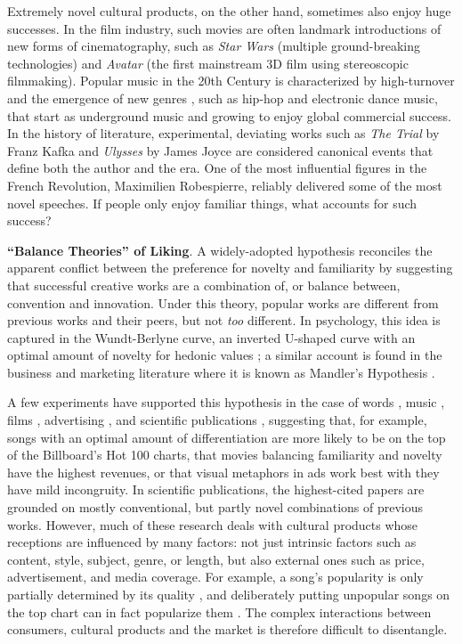\documentclass[letterpaper]{article} %
\begin{document}
Extremely novel cultural products, on the other hand, sometimes also enjoy huge successes. In the film industry, such movies are often landmark introductions of new forms of cinematography, such as \emph{Star Wars} (multiple ground-breaking technologies) and \emph{Avatar} (the first mainstream 3D film using stereoscopic filmmaking). Popular music in the 20th Century is characterized by high-turnover and the emergence of new genres \cite{mauch2015evolution}, such as hip-hop and electronic dance music, that start as underground music and growing to enjoy global commercial success. In the history of literature, experimental, deviating works such as \emph{The Trial} by Franz Kafka and \emph{Ulysses} by James Joyce are considered canonical events that define both the author and the era. One of the most influential figures in the French Revolution, Maximilien Robespierre, reliably delivered some of the most novel speeches. If people only enjoy familiar things, what accounts for such success?

\textbf{``Balance Theories'' of Liking}. A widely-adopted hypothesis reconciles the apparent conflict between the preference for novelty and familiarity by suggesting that successful creative works are a combination of, or balance between, convention and innovation. Under this theory, popular works are different from previous works and their peers, but not \emph{too} different. In psychology, this idea is captured in the Wundt-Berlyne curve, an inverted U-shaped curve with an optimal amount of novelty for hedonic values \cite{berlyne1970novelty}; a similar account is found in the business and marketing literature where it is known as Mandler's Hypothesis \cite{meyers1989schema}. 

A few experiments have supported this hypothesis in the case of words \cite{sluckin1980liking}, music \cite{hargreaves1984effects,askin2017makes},  films \cite{sreenivasan2013quantitative}, advertising \cite{mohanty2016visual}, and scientific publications \cite{uzzi2013atypical}, suggesting that, for example, songs with an optimal amount of differentiation are more likely to be on the top of the Billboard's Hot 100 charts, that movies balancing familiarity and novelty have the highest revenues, or that visual metaphors in ads work best with they have mild incongruity. In scientific publications, the highest-cited papers are grounded on mostly conventional, but partly novel combinations of previous works. However, much of these research deals with cultural products whose receptions are influenced by many factors: not just intrinsic factors such as content, style, subject, genre, or length, but also external ones such as price, advertisement, and media coverage. For example, a song's popularity is only partially determined by its quality \cite{salganik2006experimental}, and deliberately putting unpopular songs on the top chart can in fact popularize them \cite{salganik2008leading}. The complex interactions between consumers, cultural products and the market is therefore difficult to disentangle. 
 
\end{document}
